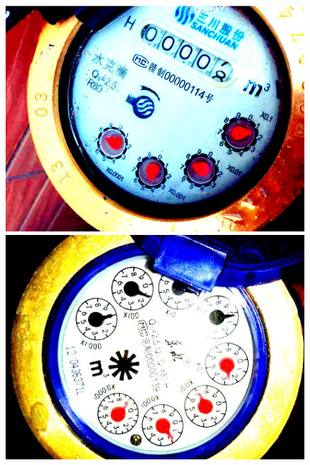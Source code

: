 \documentclass[a4paper]{ctexart}
\begin{document}
\begin{figure}[htbp]
\begin{minipage}[t]{0.25\textwidth}
		\includegraphics[width=\textwidth]{figure/msrcr/img3.jpg}
	\end{minipage}
	\begin{minipage}[t]{0.25\textwidth}
		\centering
		\includegraphics[width=\textwidth]{figure/msrcr/img4.jpg}
	\end{minipage}
	\begin{minipage}[t]{0.25\textwidth}
		\centering

\end{minipage}
\end{figure}
\end{document}
